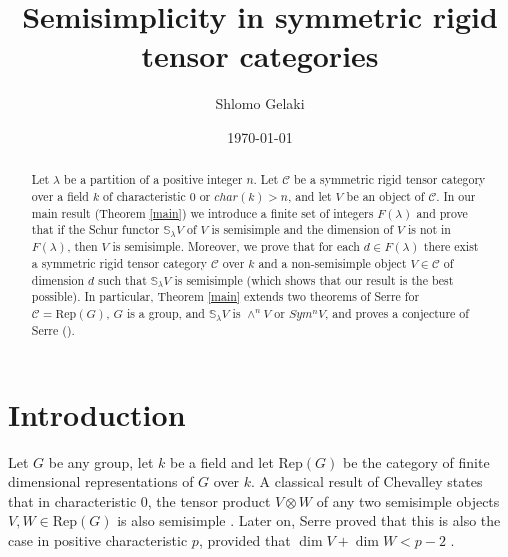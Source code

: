 \documentclass{amsart}
\theoremstyle{definition}
\newcommand{\Rep}{\text{Rep}}
\newcommand{\C}{{\mathcal C}}
\begin{document}
\title[Semisimplicity in symmetric rigid tensor categories]
{Semisimplicity in symmetric rigid tensor categories}


\author{Shlomo Gelaki}
\address{Department of Mathematics, Technion-Israel Institute of
Technology, Haifa 32000, Israel} 

\date{\today}



\begin{abstract}
Let $\lambda$ be a partition of a positive integer $n$. Let $\C$ be
a symmetric rigid tensor category over a field $k$ of characteristic
$0$ or $char(k)>n$, and let $V$ be an object of $\C$. In our main
result (Theorem \ref{main}) we introduce a finite set of integers
$F(\lambda)$ and prove that if the Schur functor
$\mathbb{S}_{\lambda}V$ of $V$ is semisimple and the dimension of
$V$ is not in $F(\lambda)$, then $V$ is semisimple. Moreover, we
prove that for each $d\in F(\lambda)$ there exist a symmetric rigid
tensor category $\C$ over $k$ and a non-semisimple object $V\in \C$
of dimension $d$ such that $\mathbb{S}_{\lambda}V$ is semisimple
(which shows that our result is the best possible). In particular,
Theorem \ref{main} extends two theorems of Serre for $\C=\Rep(G)$,
$G$ is a group, and $\mathbb{S}_{\lambda}V$ is $\wedge^n V$ or
$Sym^n V$, and proves a conjecture of Serre (\cite{s1}).
\end{abstract}

\maketitle

\section{Introduction}

Let $G$ be any group, let $k$ be a field and let $\Rep(G)$ be the
category of finite dimensional representations of $G$ over $k$. A
classical result of Chevalley states that in characteristic $0$, the
tensor product $V\otimes W$ of any two semisimple objects $V,W\in
\Rep(G)$ is also semisimple \cite{c}. Later on, Serre proved that
this is also the case in positive characteristic $p$, provided that
$\dim V +\dim W<p-2$ \cite{s2}.
\end{document}

